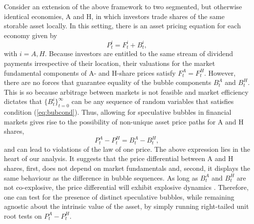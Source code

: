 \documentclass[11pt]{article}
\begin{document}
Consider an extension of the above framework to two segmented, but otherwise identical economies, A and H, in which investors trade shares of the same storable asset locally. In this setting, there is an asset pricing equation for each economy given by 
\begin{equation}
P_t^i=F_t^i+B_t^i, 
\end{equation}
with $i=A,H$. Because investors are entitled to the same stream of dividend payments irrespective of their location, their valuations for the market fundamental components of A- and H-share prices satisfy $F_t^A=F_t^H$. However, there are no forces that guarantee equality of the bubble components $B_t^A$ and $B_t^H$. This is so because  arbitrage between markets is not feasible and market efficiency dictates that $\{B_t^i\}_{t=0}^{\infty}$ can be any sequence of random variables that satisfies condition (\ref{eq:bubcond}). Thus, allowing for speculative bubbles in financial markets gives rise to the possibility of non-unique asset price paths for A and H shares,
\begin{equation}\label{eq:diffprice}
P_t^A-P_t^H=B_t^A-B_t^H,
\end{equation}
and can lead to violations of the law of one price. The above expression lies in the heart of our analysis. It suggests that the price differential between A and H shares, first, does not depend on market fundamentals and, second, it displays the same behaviour as the difference in bubble sequences. As long as $B_t^A$ and $B_t^H$ are not co-explosive, the price differential will exhibit explosive dynamics \citep[see ][]{nielsen2010}. Therefore, one can test for the presence of distinct speculative bubbles, while remaining agnostic about the intrinsic value of the asset, by simply running right-tailed unit root tests on $P_t^A-P_t^H$. %
\end{document}
